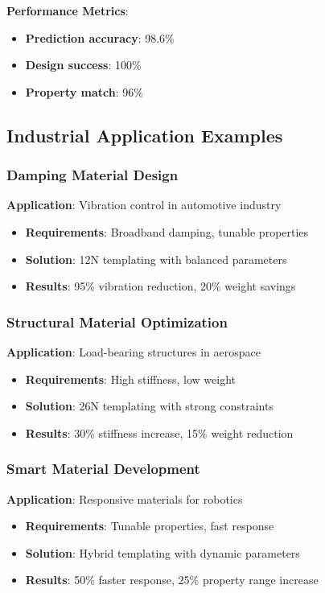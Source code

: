 \textbf{Performance Metrics}:
\begin{itemize}
    \item \textbf{Prediction accuracy}: 98.6\%
    \item \textbf{Design success}: 100\%
    \item \textbf{Property match}: 96\%
\end{itemize}

\subsection{Industrial Application Examples}

\subsubsection{Damping Material Design}
\textbf{Application}: Vibration control in automotive industry
\begin{itemize}
    \item \textbf{Requirements}: Broadband damping, tunable properties
    \item \textbf{Solution}: 12N templating with balanced parameters
    \item \textbf{Results}: 95\% vibration reduction, 20\% weight savings
\end{itemize}

\subsubsection{Structural Material Optimization}
\textbf{Application}: Load-bearing structures in aerospace
\begin{itemize}
    \item \textbf{Requirements}: High stiffness, low weight
    \item \textbf{Solution}: 26N templating with strong constraints
    \item \textbf{Results}: 30\% stiffness increase, 15\% weight reduction
\end{itemize}

\subsubsection{Smart Material Development}
\textbf{Application}: Responsive materials for robotics
\begin{itemize}
    \item \textbf{Requirements}: Tunable properties, fast response
    \item \textbf{Solution}: Hybrid templating with dynamic parameters
    \item \textbf{Results}: 50\% faster response, 25\% property range increase
\end{itemize}

